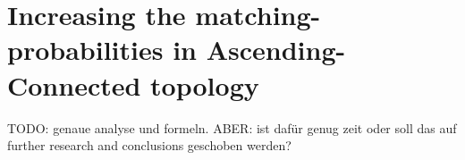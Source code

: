 \documentclass[Bachelorarbeit.tex]{subfiles}
\begin{document}
\chapter{Increasing the matching-probabilities in Ascending-Connected topology}
\label{app:increasingMatchingProbability}

TODO: genaue analyse und formeln. ABER: ist dafür genug zeit oder soll das auf further research and conclusions geschoben werden?
\end{document}
